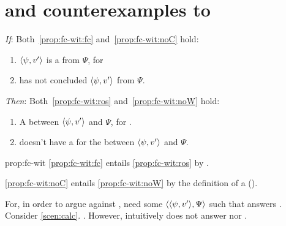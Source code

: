 \section{ and counterexamples to \issueConstraint{}}

\begin{note}
  \begin{proposition}%
    \label{prop:fc-wit}%
    \vspace{-\baselineskip}
    \begin{itenum}
    \item[\emph{If}:]
      Both~\ref{prop:fc-wit:fc} and~\ref{prop:fc-wit:noC} hold:
      \begin{enumerate}[label=\alph*., ref=(\alph*)]
      \item
        \label{prop:fc-wit:fc}
        \(\langle \psi, v' \rangle\) is a  from \(\Psi\), for \vAgent{}
      \item
        \label{prop:fc-wit:noC}
        \vAgent{} has not concluded \(\langle \psi, v' \rangle\) from \(\Psi\).
      \end{enumerate}
    \item[\emph{Then}:]
      Both~\ref{prop:fc-wit:ros} and~\ref{prop:fc-wit:noW} hold:
      \begin{enumerate}[label=\alph*\('\)., ref=(\alph*\('\))]
      \item
        \label{prop:fc-wit:ros}
        A \ros{} between \(\langle \psi, v' \rangle\) and \(\Psi\), for \vAgent{}.
      \item
        \label{prop:fc-wit:noW}
        \vAgent{} doesn't have a \wit{} for the \ros{} between \(\langle \psi, v' \rangle\) and \(\Psi\).
      \end{enumerate}
    \end{itenum}
    \vspace{-\baselineskip}
  \end{proposition}

  \begin{argument}{prop:fc-wit}
    \ref{prop:fc-wit:fc} entails \ref{prop:fc-wit:ros} by \supportII{}.

    \noindent \ref{prop:fc-wit:noC} entails \ref{prop:fc-wit:noW} by the definition of a \wit{} (\witpage{}).
  \end{argument}

  For, in order to argue against \issueConstraint{}, need some \(\langle \langle \psi, v' \rangle, \Psi \rangle\) such that answers \qWhyV{}.
  Consider \autoref{scen:calc}.
  \fc{}.
  However, intuitively does not answer \qWhy{} nor \qWhyV{}.
\end{note}

